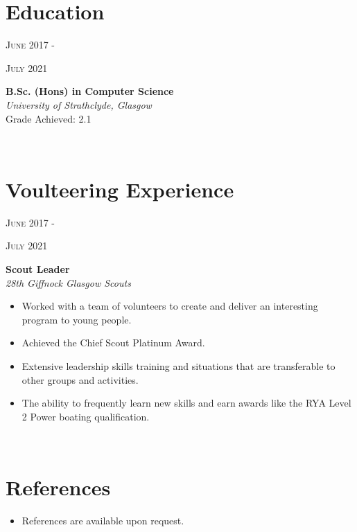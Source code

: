 \documentclass[11pt, english]{article}
\begin{document}
\section{Education}    

\begin{minipage}[t]{.15\linewidth}
	\hfill                    
\textsc{June 2017 - }

\hfill
\textsc{July 2021}
\end{minipage}
\hfill\vline\hfill
\begin{minipage}[t]{.80\linewidth}
	\textbf{B.Sc. (Hons) in Computer Science}\\
	\textit{University of Strathclyde, Glasgow}\\ 
	
	Grade Achieved: 2.1
\end{minipage}\\     




\section{Voulteering Experience}                                                    
\begin{minipage}[t]{.15\linewidth}
	\hfill                    
	\textsc{June 2017 - }
	
	\hfill
	\textsc{July 2021}
\end{minipage}
\hfill\vline\hfill
\begin{minipage}[t]{.80\linewidth}
	\textbf{Scout Leader}\\
	\textit{28th Giffnock Glasgow Scouts}\\ 
	
		\begin{itemize}[noitemsep,nolistsep]
		\item  Worked with a team of volunteers to create and deliver an interesting program to young people. 
		\item Achieved the Chief Scout Platinum Award.
		\item Extensive leadership skills training and situations that are transferable to other groups and activities.
		\item The ability to frequently learn new skills and earn awards like the RYA Level 2 Power boating qualification.
	\end{itemize}
\end{minipage}\\  


		
		\section{References}
		
		\begin{itemize}
			\setlength\itemsep{0cm}
			\item References are available upon request.
		\end{itemize}
		
	
	
\end{document}

